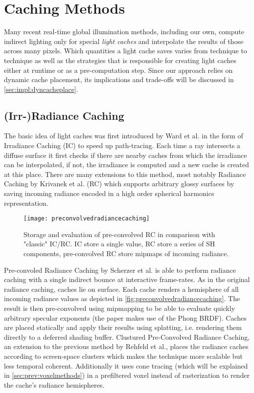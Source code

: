 \documentclass[thesis.tex]{subfiles}
\begin{document}

\section{Caching Methods}
Many recent real-time global illumination methods, including our own, compute indirect lighting only for special \emph{light caches} and interpolate the results of those across many pixels.
Which quantities a light cache saves varies from technique to technique as well as the strategies that is responsible for creating light caches either at runtime or as a pre-computation step.
Since our approach relies on dynamic cache placement, its implications and trade-offs will be discussed in \autoref{sec:impl:dyncacheplace}.

\subsection{(Irr-)Radiance Caching}
The basic idea of light caches was first introduced by Ward et al. \cite{bib:irradiancecaching} in the form of Irradiance Caching (IC) to speed up path-tracing.
Each time a ray intersects a diffuse surface it first checks if there are nearby caches from which the irradiance can be interpolated, if not, the irradiance is computed and a new cache is created at this place.
There are many extensions to this method, most notably Radiance Caching by Krivanek et al. \cite{bib:radiancecaching} (RC) which supports arbitrary glossy surfaces by saving incoming radiance encoded in a high order spherical harmonics representation.

\begin{figure}[h]
	\centering
	\texttt{[image: preconvolvedradiancecaching]}
	\caption{\cite{bib:preconvoledradiancecaching} Storage and evaluation of pre-convolved RC in comparison with "classic" IC/RC.
	IC store a single value,
	RC store a series of SH components,
	pre-convolved RC store mipmaps of incoming radiance.} \label{fig:preconvolvedradiancecaching}
\end{figure}
Pre-convoled Radiance Caching by Scherzer et al. \cite{bib:preconvoledradiancecaching} is able to perform radiance caching with a single indirect bounce at interactive frame-rates.
As in the original radiance caching, caches lie on surface.
Each cache renders a hemisphere of all incoming radiance values as depicted in \autoref{fig:preconvolvedradiancecaching}.
The result is then pre-convolved using mipmapping to be able to evaluate quickly arbitrary specular exponents (the paper makes use of the Phong BRDF).
Caches are placed statically and apply their results using splatting, i.e. rendering them directly to a deferred shading buffer.
Clustured Pre-Convolved Radiance Caching, an extension to the previous method by Rehfeld et al., places the radiance caches according to screen-space clusters which makes the technique more scalable but less temporal coherent.
Additionally it uses cone tracing (which will be explained in \autoref{sec:prev:voxelmethods}) in a prefiltered voxel instead of rasterization to render the cache's radiance hemispheres.
\end{document}
